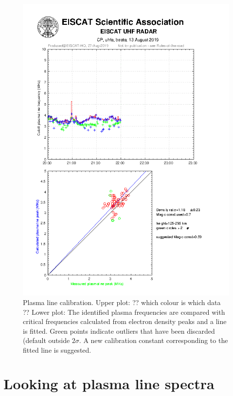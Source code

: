 \documentclass[a4]{article}
\begin{document}
\begin{figure}
  \begin{center}
    \includegraphics[width=0.9\linewidth]{2019-08-13_beata_60_pl_check_2030-2230@uhfa}
  \end{center}
  \caption{\label{fig:calib-pl-ne}Plasma line calibration. \newline
    Upper plot: ?? which colour is which data ?? \newline
    Lower plot: The identified plasma frequencies are compared with
    critical frequencies calculated from electron density peaks and a
    line is fitted. Green points indicate outliers that have been
    discarded (default outside $2\sigma{}$. A new calibration constant
    corresponding to the fitted line is suggested.}
  
\end{figure}


\clearpage{}

\section{Looking at plasma line spectra}
\label{sec:looking-at-plasma}
\end{document}
